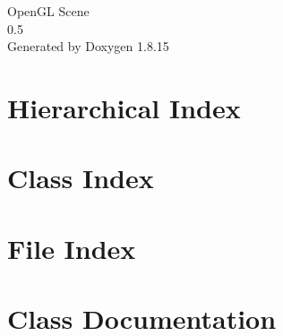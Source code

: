 \let\mypdfximage\pdfximage\def\pdfximage{\immediate\mypdfximage}\documentclass[twoside]{book}
\newcommand{\+}{\discretionary{\mbox{\scriptsize$\hookleftarrow$}}{}{}}
\newcommand{\clearemptydoublepage}{%
  \newpage{\pagestyle{empty}\cleardoublepage}%
}
\begin{document}
\hypersetup{pageanchor=false,
             bookmarksnumbered=true,
             pdfencoding=unicode
            }
\begin{titlepage}
\vspace*{7cm}
\begin{center}%
{\Large Open\+GL Scene \\[1ex]\large 0.\+5 }\\
\vspace*{1cm}
{\large Generated by Doxygen 1.8.15}\\
\end{center}
\end{titlepage}
\clearemptydoublepage
{}
\tableofcontents
\clearemptydoublepage
{}
\hypersetup{pageanchor=true}

\chapter{Hierarchical Index}

\chapter{Class Index}

\chapter{File Index}

\chapter{Class Documentation}






































\end{document}
